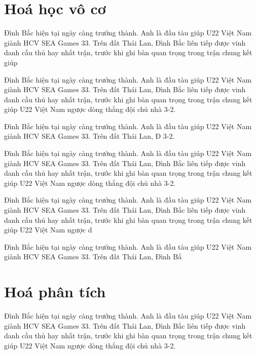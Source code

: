 \section{Hoá học vô cơ}

Đình Bắc hiện tại ngày càng trưởng thành. Anh là đầu tàu giúp U22 Việt Nam giành HCV SEA Games 33. Trên đất Thái Lan, Đình Bắc liên tiếp được vinh danh cầu thủ hay nhất trận, trước khi ghi bàn quan trọng trong trận chung kết giúp 
\begin{remark}
    Đình Bắc hiện tại ngày càng trưởng thành. Anh là đầu tàu giúp U22 Việt Nam giành HCV SEA Games 33. Trên đất Thái Lan, Đình Bắc liên tiếp được vinh danh cầu thủ hay nhất trận, trước khi ghi bàn quan trọng trong trận chung kết giúp U22 Việt Nam ngược dòng thắng đội chủ nhà 3-2.
\end{remark}

Đình Bắc hiện tại ngày càng trưởng thành. Anh là đầu tàu giúp U22 Việt Nam giành HCV SEA Games 33. Trên đất Thái Lan, Đ 3-2.

\begin{example}  
Đình Bắc hiện tại ngày càng trưởng thành. Anh là đầu tàu giúp U22 Việt Nam giành HCV SEA Games 33. Trên đất Thái Lan, Đình Bắc liên tiếp được vinh danh cầu thủ hay nhất trận, trước khi ghi bàn quan trọng trong trận chung kết giúp U22 Việt Nam ngược dòng thắng đội chủ nhà 3-2.
\end{example}

Đình Bắc hiện tại ngày càng trưởng thành. Anh là đầu tàu giúp U22 Việt Nam giành HCV SEA Games 33. Trên đất Thái Lan, Đình Bắc liên tiếp được vinh danh cầu thủ hay nhất trận, trước khi ghi bàn quan trọng trong trận chung kết giúp U22 Việt Nam ngược d

\begin{problem}
    Đình Bắc hiện tại ngày càng trưởng thành. Anh là đầu tàu giúp U22 Việt Nam giành HCV SEA Games 33. Trên đất Thái Lan, Đình Bắ
\end{problem}


\section{Hoá phân tích}

Đình Bắc hiện tại ngày càng trưởng thành. Anh là đầu tàu giúp U22 Việt Nam giành HCV SEA Games 33. Trên đất Thái Lan, Đình Bắc liên tiếp được vinh danh cầu thủ hay nhất trận, trước khi ghi bàn quan trọng trong trận chung kết giúp U22 Việt Nam ngược dòng thắng đội chủ nhà 3-2.

